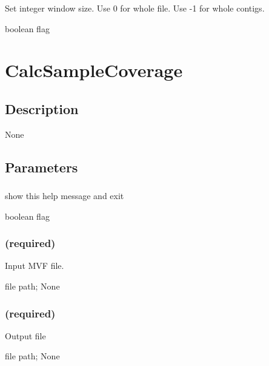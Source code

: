 \documentclass[letterpaper,11pt,english]{sphinxmanual}
\begin{document}
\subsubsection{}
\label{\detokenize{prog_desc:id82}}
 Set integer window size. Use 0 for whole file. Use -1 for whole contigs.

 boolean flag


\section{CalcSampleCoverage}
\label{\detokenize{prog_desc:calcsamplecoverage}}

\subsection{Description}
\label{\detokenize{prog_desc:id83}}
None


\subsection{Parameters}
\label{\detokenize{prog_desc:id84}}

\subsubsection{}
\label{\detokenize{prog_desc:id85}}
 show this help message and exit

 boolean flag


\subsubsection{ (required)}
\label{\detokenize{prog_desc:id86}}
 Input MVF file.

 file path;  None


\subsubsection{ (required)}
\label{\detokenize{prog_desc:id87}}
 Output file

 file path;  None
\end{document}
